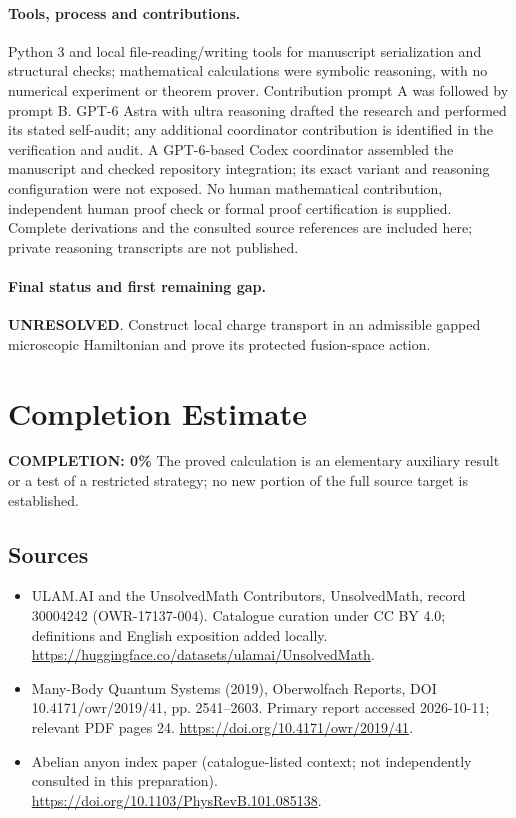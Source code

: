 \documentclass[11pt]{article}
\begin{document}
\paragraph{Tools, process and contributions.}
Python 3 and local file-reading/writing tools for manuscript serialization and structural checks; mathematical calculations were symbolic reasoning, with no numerical experiment or theorem prover. Contribution prompt A was followed by prompt B. GPT-6 Astra with ultra reasoning drafted the research and performed its stated self-audit; any additional coordinator contribution is identified in the verification and audit. A GPT-6-based Codex coordinator assembled the manuscript and checked repository integration; its exact variant and reasoning configuration were not exposed. No human mathematical contribution, independent human proof check or formal proof certification is supplied. Complete derivations and the consulted source references are included here; private reasoning transcripts are not published.

\paragraph{Final status and first remaining gap.}
\textbf{UNRESOLVED}. Construct local charge transport in an admissible gapped microscopic Hamiltonian and prove its protected fusion-space action.

\section{Completion Estimate}
\noindent\textbf{COMPLETION: 0\%}
The proved calculation is an elementary auxiliary result or a test of a restricted strategy; no new portion of the full source target is established.

\subsection{Sources}
\begin{itemize}
\item[\hypertarget{source:30004242:1}{S1}] ULAM.AI and the UnsolvedMath Contributors, UnsolvedMath, record 30004242 (OWR-17137-004). Catalogue curation under CC BY 4.0; definitions and English exposition added locally.
\url{https://huggingface.co/datasets/ulamai/UnsolvedMath}.
\item[\hypertarget{source:30004242:2}{S2}] Many-Body Quantum Systems (2019), Oberwolfach Reports, DOI 10.4171/owr/2019/41, pp. 2541--2603. Primary report accessed 2026-10-11; relevant PDF pages 24.
\url{https://doi.org/10.4171/owr/2019/41}.
\item[\hypertarget{source:30004242:3}{S3}] Abelian anyon index paper (catalogue-listed context; not independently consulted in this preparation).
\url{https://doi.org/10.1103/PhysRevB.101.085138}.
\end{itemize}
\label{end:30004242}
\end{document}
